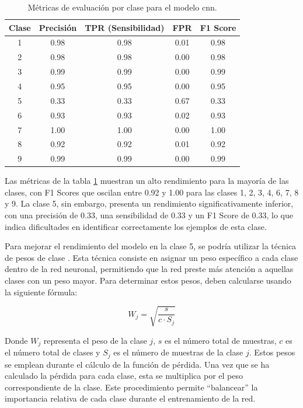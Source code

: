 \begin{table}[H]
    \centering
    \begin{tabular}{|c|c|c|c|c|}
        \hline
        \textbf{Clase} & \textbf{Precisión} & \textbf{TPR (Sensibilidad)} & \textbf{FPR} & \textbf{F1 Score} \\
        \hline
        1 & 0.98 & 0.98 & 0.01 & 0.98 \\
        2 & 0.98 & 0.98 & 0.00 & 0.98 \\
        3 & 0.99 & 0.99 & 0.00 & 0.99 \\
        4 & 0.95 & 0.95 & 0.00 & 0.95 \\
        5 & 0.33 & 0.33 & 0.67 & 0.33 \\
        6 & 0.93 & 0.93 & 0.02 & 0.93 \\
        7 & 1.00 & 1.00 & 0.00 & 1.00 \\
        8 & 0.92 & 0.92 & 0.01 & 0.92 \\
        9 & 0.99 & 0.99 & 0.00 & 0.99 \\
        \hline
    \end{tabular}
    \caption{Métricas de evaluación por clase para el modelo \acrshort{cnn}.}
    \label{tab: cnnMetrics}
\end{table}

Las métricas de la tabla \ref{tab: cnnMetrics} muestran un alto rendimiento para la mayoría de las clases, con F1 Scores que oscilan entre 0.92 y 1.00 para las clases 1, 2, 3, 4, 6, 7, 8 y 9. La clase 5, sin embargo, presenta un rendimiento significativamente inferior, con una precisión de 0.33, una sensibilidad de 0.33 y un F1 Score de 0.33, lo que indica dificultades en identificar correctamente los ejemplos de esta clase.

Para mejorar el rendimiento del modelo en la clase 5, se podría utilizar la técnica de pesos de clase \citep{amoros2021desbalanceo}. Esta técnica consiste en asignar un peso específico a cada clase dentro de la red neuronal, permitiendo que la red preste más atención a aquellas clases con un peso mayor. Para determinar estos pesos, deben calcularse usando la siguiente fórmula:

\[
W_j = \sqrt{\frac{s}{c \cdot S_j}}
\]

Donde $W_j$ representa el peso de la clase $j$, $s$ es el número total de muestras, $c$ es el número total de clases y $S_j$ es el número de muestras de la clase $j$. Estos pesos se emplean durante el cálculo de la función de pérdida. Una vez que se ha calculado la pérdida para cada clase, esta se multiplica por el peso correspondiente de la clase. Este procedimiento permite ``balancear'' la importancia relativa de cada clase durante el entrenamiento de la red.

